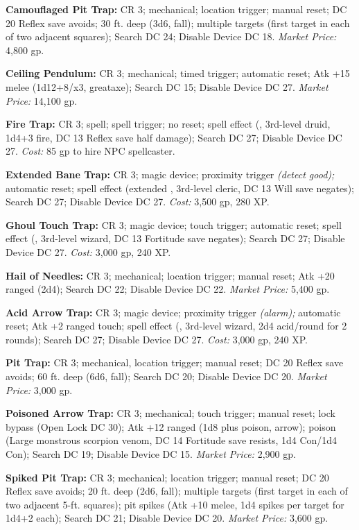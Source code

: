 \textbf{Camouflaged Pit Trap:} CR 3; mechanical; location trigger; manual reset; 
DC 20 Reflex save avoids; 30 ft. deep (3d6, fall); multiple targets (first target 
in each of two adjacent squares); Search DC 24; Disable Device DC 18. \textit{Market 
Price:} 4,800 gp.

\textbf{Ceiling Pendulum:} CR 3; mechanical; timed trigger; automatic reset; Atk 
+15 melee (1d12+8/x3, greataxe); Search DC 15; Disable Device DC 27. \textit{Market 
Price:} 14,100 gp.

\textbf{Fire Trap:} CR 3; spell; spell trigger; no reset; spell 
effect (, 3rd-level druid, 1d4+3 fire, DC 13 Reflex save half 
damage); Search DC 27; Disable Device DC 27. \textit{Cost:} 85 gp to hire NPC spellcaster.

\textbf{Extended Bane Trap:} CR 3; magic device; proximity 
trigger \textit{(detect good); }automatic reset; spell effect (extended , 
3rd-level cleric, DC 13 Will save negates); Search DC 27; Disable Device DC 27. 
\textit{Cost:} 3,500 gp, 280 XP.

\textbf{Ghoul Touch Trap:} CR 3; magic device; touch trigger; 
automatic reset; spell effect (, 3rd-level wizard, DC 13 Fortitude 
save negates); Search DC 27; Disable Device DC 27. \textit{Cost:} 3,000 gp, 240 
XP. 

\textbf{Hail of Needles:} CR 3; mechanical; location trigger; manual reset; Atk 
+20 ranged (2d4); Search DC 22; Disable Device DC 22. \textit{Market Price:} 5,400 
gp.

\textbf{Acid Arrow Trap:} CR 3; magic device; proximity trigger 
\textit{(alarm); }automatic reset; Atk +2 ranged touch; spell effect (,
3rd-level wizard, 2d4 acid/round for 2 rounds); Search DC 27; Disable Device 
DC 27. \textit{Cost:} 3,000 gp, 240 XP.

\textbf{Pit Trap:} CR 3; mechanical, location trigger; manual reset; DC 20 Reflex 
save avoids; 60 ft. deep (6d6, fall); Search DC 20; Disable Device DC 20. \textit{Market 
Price:} 3,000 gp.

\textbf{Poisoned Arrow Trap:} CR 3; mechanical; touch trigger; manual reset; lock 
bypass (Open Lock DC 30); Atk +12 ranged (1d8 plus poison, arrow); poison (Large 
monstrous scorpion venom, DC 14 Fortitude save resists, 1d4 Con/1d4 Con); Search 
DC 19; Disable Device DC 15. \textit{Market Price:} 2,900 gp.

\textbf{Spiked Pit Trap:} CR 3; mechanical; location trigger; manual reset; DC 
20 Reflex save avoids; 20 ft. deep (2d6, fall); multiple targets (first target 
in each of two adjacent 5-ft. squares); pit spikes (Atk +10 melee, 1d4 spikes per 
target for 1d4+2 each); Search DC 21; Disable Device DC 20. \textit{Market Price: 
}3,600 gp.

